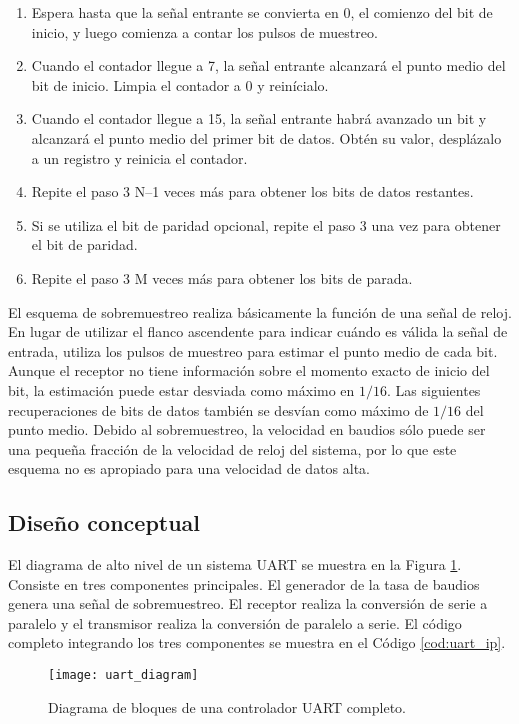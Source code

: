     \begin{enumerate}
      \item Espera hasta que la señal entrante se convierta en 0, el comienzo del bit de inicio, y luego comienza a contar los pulsos de muestreo.
      \item Cuando el contador llegue a 7, la señal entrante alcanzará el punto medio del bit de inicio. Limpia el contador a 0 y reinícialo.
      \item Cuando el contador llegue a 15, la señal entrante habrá avanzado un bit y alcanzará el punto medio del primer bit de datos. Obtén su valor, desplázalo a un registro y reinicia el contador.
      \item Repite el paso 3 N–1 veces más para obtener los bits de datos restantes.
      \item Si se utiliza el bit de paridad opcional, repite el paso 3 una vez para obtener el bit de paridad.
      \item Repite el paso 3 M veces más para obtener los bits de parada.
    \end{enumerate}

    El esquema de sobremuestreo realiza básicamente la función de una señal de reloj. En lugar de utilizar el flanco ascendente para indicar cuándo es válida la señal de entrada, utiliza los pulsos de muestreo para estimar el punto medio de cada bit. Aunque el receptor no tiene información sobre el momento exacto de inicio del bit, la estimación puede estar desviada como máximo en $1/16$. Las siguientes recuperaciones de bits de datos también se desvían como máximo de $1/16$ del punto medio. Debido al sobremuestreo, la velocidad en baudios sólo puede ser una pequeña fracción de la velocidad de reloj del sistema, por lo que este esquema no es apropiado para una velocidad de datos alta.


    \subsection{Diseño conceptual}

      El diagrama de alto nivel de un sistema UART se muestra en la Figura \ref{fig:uart_diagram}. Consiste en tres componentes principales. El generador de la tasa de baudios genera una señal de sobremuestreo. El receptor realiza la conversión de serie a paralelo y el transmisor realiza la conversión de paralelo a serie. El código completo integrando los tres componentes se muestra en el Código \ref{cod:uart_ip}.

    \begin{figure}[h!]
      \centering
      \texttt{[image: uart\_diagram]}
      \caption{Diagrama de bloques de una controlador UART completo.}
      \label{fig:uart_diagram}
    \end{figure}

